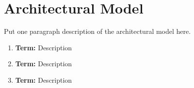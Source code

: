 \newpage
\section{Architectural Model}
Put one paragraph description of the architectural model here.





\begin{enumerate}
    \item \textbf{Term:} Description
    \item \textbf{Term:} Description
    \item \textbf{Term:} Description
   
\end{enumerate}